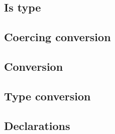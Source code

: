 \documentclass[a4paper,11pt]{article}
\begin{document}
\subsection{Is type}

\subsection{Coercing conversion}

\subsection{Conversion}

\subsection{Type conversion}

\subsection{Declarations}
\end{document}
